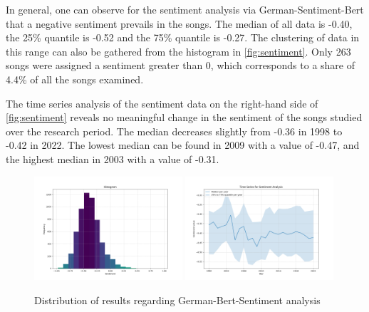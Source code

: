 In general, one can observe for the sentiment analysis via German-Sentiment-Bert that a negative sentiment prevails in the songs. The median of all data is -0.40, the 25\% quantile is -0.52 and the 75\% quantile is -0.27. The clustering of data in this range can also be gathered from the histogram in \autoref{fig:sentiment}. Only 263 songs were assigned a sentiment greater than 0, which corresponds to a share of 4.4\% of all the songs examined. 

The time series analysis of the sentiment data on the right-hand side of \autoref{fig:sentiment} reveals no meaningful change in the sentiment of the songs studied over the research period. The median decreases slightly from -0.36 in 1998 to -0.42 in 2022. The lowest median can be found in 2009 with a value of -0.47, and the highest median in 2003 with a value of -0.31.

\begin{figure}[!htb]
    \centering
    \includegraphics[width=0.49\textwidth]{figures/sentiment_histogram.png}
    \includegraphics[width=0.49\textwidth]{figures/time_series_sentiment.png}
    \caption{Distribution of results regarding German-Bert-Sentiment analysis}
    \label{fig:sentiment}
\end{figure}

